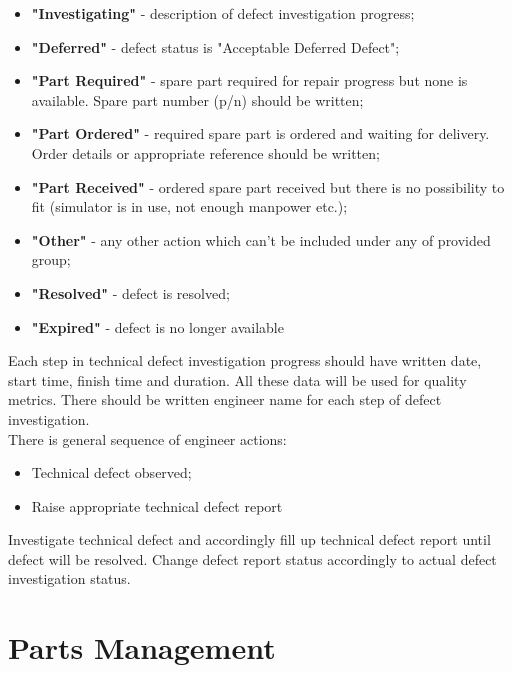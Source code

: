             \begin{itemize}
                \item \textbf{"Investigating"} - description of defect investigation progress;
                \item \textbf{"Deferred"} - defect status is "Acceptable Deferred Defect";
                \item \textbf{"Part Required"} - spare part required for repair progress but none is available. Spare part number (p/n) should be written;
                \item \textbf{"Part Ordered"} - required spare part is ordered and waiting for delivery. Order details or appropriate reference should be written;
                \item \textbf{"Part Received"} - ordered spare part received but there is no possibility to fit (simulator is in use, not enough manpower etc.);
                \item \textbf{"Other"} - any other action which can't be included under any of provided group;
                \item \textbf{"Resolved"} - defect is resolved;
                \item \textbf{"Expired"} - defect is no longer available
            \end{itemize}
            Each step in technical defect investigation progress should have written date, start time, finish time and duration. All these data will be used 
            for quality metrics. There should be written engineer name for each step of defect investigation. \\ 
            \vspace{3mm}
            There is general sequence of engineer actions:
            \begin{itemize}
                \item Technical defect observed;
                \item Raise appropriate technical defect report
            \end{itemize}
            Investigate technical defect and accordingly fill up technical defect report until defect will be resolved. Change defect report status accordingly 
            to actual defect investigation status.

\section{Parts Management}
